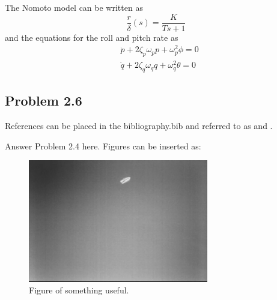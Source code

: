 The Nomoto model can be written as
\begin{equation}
	\frac{r}{\delta} (s) = \frac{K}{Ts+1}
\end{equation}
and the equations for the roll and pitch rate as
\begin{equation}
\begin{aligned}
	&\dot{p} + 2\zeta_p\omega_p p + \omega_p^2 \phi = 0\\
	&\dot{q} + 2\zeta_q\omega_q q + \omega_q^2 \theta = 0
\end{aligned}
\end{equation}

\subsection*{Problem 2.6}
References can be placed in the bibliography.bib and referred to as \cite{Fossen2011} and \cite{Fjellstad1994857}.



Answer Problem 2.4 here. Figures can be inserted as:
\begin{figure}[ht]
	\centering
	\includegraphics[width=0.7\textwidth]{assignment_1/rapport/figures/fig1} 
	\caption{Figure of something useful.}
	\label{fig:fig1}
\end{figure}

